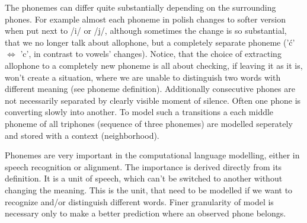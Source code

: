 \documentclass[12pt,a4paper,english]{article}
\begin{document}
The phonemes can differ quite substantially depending on the surrounding phones. For example almost each phoneme in polish changes to softer version when put next to /i/ or /j/, although sometimes the change is so substantial, that we no longer talk about allophone, but a completely separate phoneme ('ć' $\iff$ 'c', in contrast to vowels' changes). Notice, that the choice of extracting allophone to a completely new phoneme is all about checking, if leaving it as it is, won't create a situation, where we are unable to distinguish two words with different meaning (see phoneme definition).
Additionally consecutive phones are not necessarily separated by clearly visible moment of silence. Often one phone is converting slowly into another. To model such a transitions a each middle phoneme of all triphones (sequence of three phonemes) are modelled seperately and stored with a context (neighborhood). \newline

Phonemes are very important in the computational language modelling, either in speech recognition or alignment. The importance is derived directly from its definition. It is a unit of speech, which can't be switched to another without changing the meaning. This is the unit, that need to be modelled if we want to recognize and/or distinguish different words. Finer granularity of model is necessary only to make a better prediction where an observed phone belongs.
\end{document}
